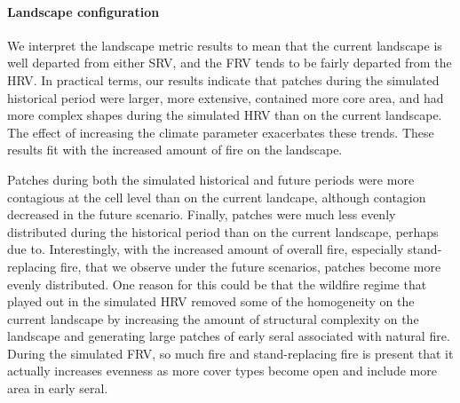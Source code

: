 \documentclass[12pt]{article}
\begin{document}
\begin{spacing}{1}
\paragraph{Landscape configuration}
 We interpret the landscape metric results to mean that the current landscape is well departed from either SRV, and the FRV tends to be fairly departed from the HRV. In practical terms, our results indicate that patches during the simulated historical period were larger, more extensive, contained more core area, and had more complex shapes during the simulated HRV than on the current landscape. The effect of increasing the climate parameter exacerbates these trends. These results fit with the increased amount of fire on the landscape.

Patches during both the simulated historical and future periods were more contagious at the cell level than on the current landcape, although contagion decreased in the future scenario. Finally, patches were much less evenly distributed during the historical period than on the current landscape, perhaps due to. Interestingly, with the increased amount of overall fire, especially stand-replacing fire, that we observe under the future scenarios, patches become more evenly distributed. One reason for this could be that the wildfire regime that played out in the simulated HRV removed some of the homogeneity on the current landscape by increasing the amount of structural complexity on the landscape and generating large patches of early seral associated with natural fire. During the simulated FRV, so much fire and stand-replacing fire is present that it actually increases evenness as more cover types become open and include more area in early seral.




\end{spacing}
\end{document}
